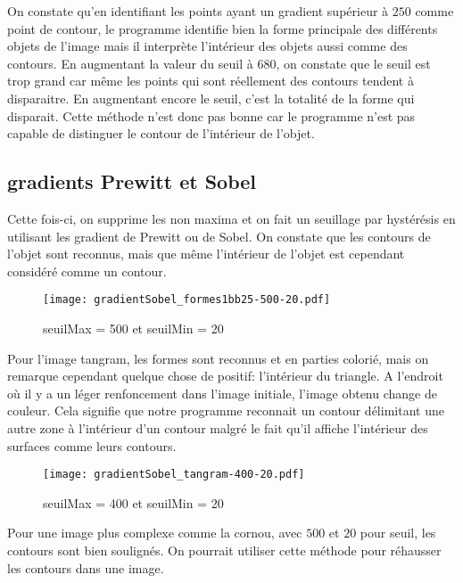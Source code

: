\documentclass[12pt]{article}
\numberwithin{equation}{section}
\begin{document}
On constate qu'en identifiant les points ayant un gradient supérieur à $250$ comme point de contour, le programme identifie bien la forme principale des différents objets de l'image mais il interprète l'intérieur des objets aussi comme des contours. En augmentant la valeur du seuil à 680, on constate que le seuil est trop grand car même les points qui sont réellement des contours tendent à disparaitre. En augmentant encore le seuil, c'est la totalité de la forme qui disparait. Cette méthode n'est donc pas bonne car le programme n'est pas capable de distinguer le contour de l'intérieur de l'objet.

\subsection{gradients Prewitt et Sobel}
Cette fois-ci, on supprime les non maxima et on fait un seuillage par hystérésis en utilisant les gradient de Prewitt ou de Sobel. On constate que les contours de l'objet sont reconnus, mais que même l'intérieur de l'objet est cependant considéré comme un contour.

	\begin{figure}[!ht]
        \begin{center}
           \texttt{[image: gradientSobel\_formes1bb25-500-20.pdf]} 
           \caption{seuilMax = 500 et seuilMin = 20}
        \end{center}
    \end{figure}

Pour l'image tangram, les formes sont reconnus et en parties colorié, mais on remarque cependant quelque chose de positif: l'intérieur du triangle. A l'endroit où il y a un léger renfoncement dans l'image initiale, l'image obtenu change de couleur. Cela signifie que notre programme reconnait un contour délimitant une autre zone à l'intérieur d'un contour malgré le fait qu'il affiche l'intérieur des surfaces comme leurs contours.
	\begin{figure}[!ht]
        \begin{center}
           \texttt{[image: gradientSobel\_tangram-400-20.pdf]} 
           \caption{seuilMax = 400 et seuilMin = 20}
        \end{center}
    \end{figure}

Pour une image plus complexe comme la cornou, avec $500$ et $20$ pour seuil, les contours sont bien soulignés. On pourrait utiliser cette méthode pour réhausser les contours dans une image.
\end{document}
